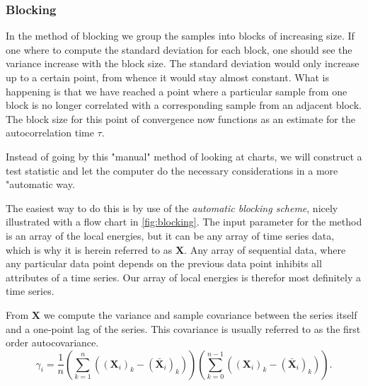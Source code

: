 \documentclass[
    a4paper, aps, twocolumn, floatfix, superscriptaddress, nofootinbib]{revtex4-1}
\newcommand{\1}{\mathds{1}}
\begin{document}
        \subsubsection{Blocking}
        In the method of blocking we group the samples into blocks of increasing size. If one where to compute
        the standard deviation for each block, one should see the variance increase with the block size.
        The standard deviation would only increase up to a certain point, from whence it would stay
        almost constant. What is happening is that we have reached a point where a particular
        sample from one block is no longer correlated with a corresponding sample from an adjacent block.
        The block size for this point of convergence now functions as an estimate for the autocorrelation
        time $\tau$.
        
     	Instead of going by this "manual" method of looking at charts, we will construct a test statistic and
     	let the computer do the necessary considerations in a more "automatic way.
        
        The easiest way to do this is by use of the \emph{automatic blocking scheme}, nicely illustrated 
        with a flow chart in \autoref{fig:blocking}. The input parameter for the method is an array of the 
        local energies, but it can be any array of time series data, which is why it is herein referred to as
        $\mathbf{X}$. Any array of sequential data, where any particular data point depends on the previous
        data point inhibits all attributes of a time series. Our array of local energies is therefor most definitely 
        a time series. 
        
		From $\mathbf{X}$ we compute the variance and sample covariance between the series itself and a 
		one-point lag of the series. This covariance is usually referred to as the first order autocovariance.
		\begin{equation}
			\gamma_i = \frac{1}{n}
				\left(\sum_{k=1}^n\left((\mathbf{X}_i)_k - (\bar{\mathbf{X}}_i)_k\right)\right)
				\left(\sum_{k=0}^{n-1}\left((\mathbf{X}_i)_k - (\bar{\mathbf{X}}_i)_k\right)\right).
		\end{equation}
		
\end{document}
